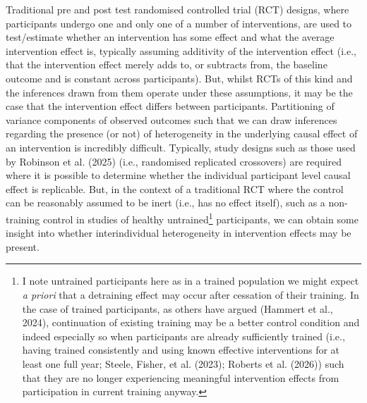 \documentclass[
]{article}
\begin{document}
Traditional pre and post test randomised controlled trial (RCT) designs,
where participants undergo one and only one of a number of
interventions, are used to test/estimate whether an intervention has
some effect and what the average intervention effect is, typically
assuming additivity of the intervention effect (i.e., that the
intervention effect merely adds to, or subtracts from, the baseline
outcome and is constant across participants). But, whilst RCTs of this
kind and the inferences drawn from them operate under these assumptions,
it may be the case that the intervention effect differs between
participants. Partitioning of variance components of observed outcomes
such that we can draw inferences regarding the presence (or not) of
heterogeneity in the underlying causal effect of an intervention is
incredibly difficult. Typically, study designs such as those used by
Robinson et al. (2025) (i.e., randomised replicated crossovers) are
required where it is possible to determine whether the individual
participant level causal effect is replicable. But, in the context of a
traditional RCT where the control can be reasonably assumed to be inert
(i.e., has no effect itself), such as a non-training control in studies
of healthy untrained\footnote{I note untrained participants here as in a
  trained population we might expect \emph{a priori} that a detraining
  effect may occur after cessation of their training. In the case of
  trained participants, as others have argued (Hammert et al., 2024),
  continuation of existing training may be a better control condition
  and indeed especially so when participants are already sufficiently
  trained (i.e., having trained consistently and using known effective
  interventions for at least one full year; Steele, Fisher, et al.
  (2023); Roberts et al. (2026)) such that they are no longer
  experiencing meaningful intervention effects from participation in
  current training anyway.} participants, we can obtain some insight
into whether interindividual heterogeneity in intervention effects may
be present.
\end{document}
